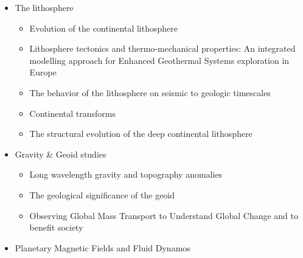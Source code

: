 \begin{itemize}
\item The lithosphere
   \begin{itemize}
   \item [\twothousandfive] Evolution of the continental lithosphere \cite{slee05}
   \item [\twothousandten] Lithosphere tectonics and thermo-mechanical properties: An integrated modelling
         approach for Enhanced Geothermal Systems exploration in Europe \cite{clvz10}
   \item [\twothousandthirteen] The behavior of the lithosphere on seismic to geologic timescales \cite{wazh13}
   \item [\twothousandfourteen] Continental transforms \cite{noto14}
   \item [\twothousandseventeen] The structural evolution of the deep continental lithosphere \cite{comm17}
   \end{itemize}

\item Gravity \& Geoid studies
   \begin{itemize}
   \item Long wavelength gravity and topography anomalies \cite{wada81}
   \item The geological significance of the geoid \cite{chas85}
   \item Observing Global Mass Transport to Understand Global Change and to benefit society \cite{pabb15}
   \end{itemize}

\item Planetary Magnetic Fields and Fluid Dynamos \cite{jone11}



\end{itemize}
